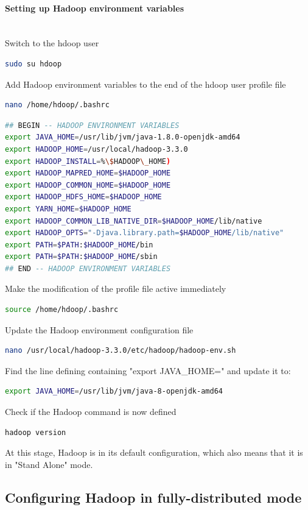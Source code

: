 \documentclass[12pt,english]{book}
\begin{document}
\paragraph{Setting up Hadoop environment variables}\mbox{}\\


Switch to the hdoop user
\begin{lstlisting}[language=bash, frame=single]
sudo su hdoop
\end{lstlisting}
Add Hadoop environment variables to the end of the hdoop user profile file
\begin{lstlisting}[language=bash, frame=single]
nano /home/hdoop/.bashrc
\end{lstlisting}
\begin{lstlisting}[language=bash, frame=single]
## BEGIN -- HADOOP ENVIRONMENT VARIABLES
export JAVA_HOME=/usr/lib/jvm/java-1.8.0-openjdk-amd64
export HADOOP_HOME=/usr/local/hadoop-3.3.0
export HADOOP_INSTALL=%\$HADOOP\_HOME)
export HADOOP_MAPRED_HOME=$HADOOP_HOME
export HADOOP_COMMON_HOME=$HADOOP_HOME
export HADOOP_HDFS_HOME=$HADOOP_HOME
export YARN_HOME=$HADOOP_HOME
export HADOOP_COMMON_LIB_NATIVE_DIR=$HADOOP_HOME/lib/native
export HADOOP_OPTS="-Djava.library.path=$HADOOP_HOME/lib/native"
export PATH=$PATH:$HADOOP_HOME/bin
export PATH=$PATH:$HADOOP_HOME/sbin
## END -- HADOOP ENVIRONMENT VARIABLES
\end{lstlisting}
Make the modification of the profile file active immediately
\begin{lstlisting}[language=bash, frame=single]
source /home/hdoop/.bashrc
\end{lstlisting}
Update the Hadoop environment configuration file 
\begin{lstlisting}[language=bash, frame=single]
nano /usr/local/hadoop-3.3.0/etc/hadoop/hadoop-env.sh
\end{lstlisting}
Find the line defining containing "export JAVA\_HOME=" and update it to:
\begin{lstlisting}[language=bash, frame=single]
export JAVA_HOME=/usr/lib/jvm/java-8-openjdk-amd64
\end{lstlisting}
Check if the Hadoop command is now defined
\begin{lstlisting}[language=bash, frame=single]
hadoop version
\end{lstlisting}
At this stage, Hadoop is in its default configuration, which also means that it is in "Stand Alone" mode.


\subsection{Configuring Hadoop in fully-distributed mode}
\end{document}
